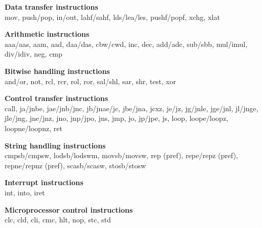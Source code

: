 \documentclass[11pt,peerreviewca]{IEEEtran}
\begin{document}
{\noindent\bf Data transfer instructions} \\
mov, push/pop, in/out, lahf/sahf, lds/lea/les, pushf/popf, xchg, xlat

{\noindent\bf Arithmetic instructions} \\
aaa/aas, aam, aad, daa/das, cbw/cwd, inc, dec, add/adc, sub/sbb, mul/imul, div/idiv, neg, cmp

{\noindent\bf Bitwise handling instructions} \\
and/or, not, rcl, rcr, rol, ror, sal/shl, sar, shr, test, xor

{\noindent\bf Control transfer instructions} \\
call, ja/jnbe, jae/jnb/jnc, jb/jnae/jc, jbe/jna, jcxz, je/jz, jg/jnle, jge/jnl, jl/jnge, jle/jng, jne/jnz, jno, jnp/jpo, jns, jmp, jo, jp/jpe, js, loop, loope/loopz, loopne/loopnz, ret

{\noindent\bf String handling instructions}\\
cmpsb/cmpsw, lodsb/lodswm, movsb/movsw, rep (pref), repe/repz (pref), repne/repnz (pref), scasb/scasw, stosb/stosw

{\noindent\bf Interrupt instructions} \\
int, into, iret

{\noindent\bf Microprocessor control instructions} \\
clc, cld, cli, cmc, hlt, nop, stc, std





\end{document}
